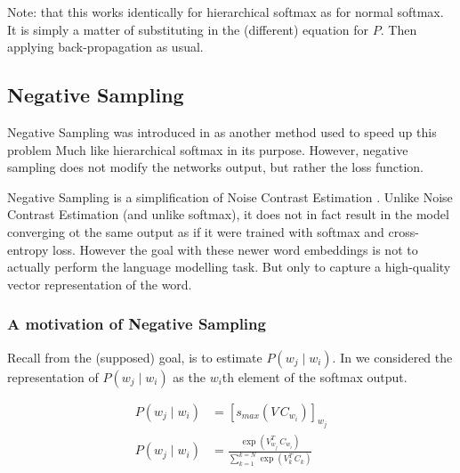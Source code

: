 \documentclass[parskip]{komatufte}
\begin{document}
Note: that this works identically for hierarchical softmax as for normal softmax.
It is simply a matter of substituting in the (different) equation for $P$.
Then applying back-propagation as usual.

\subsection{Negative Sampling}


Negative Sampling was introduced in  as another method used to speed up this problem
Much like hierarchical softmax in its purpose.
However, negative sampling does not modify the networks output,
but rather the loss function.


Negative Sampling is a simplification of Noise Contrast Estimation .
Unlike Noise Contrast Estimation (and unlike softmax), it does not in fact result in the model converging ot the same output as if it were trained with softmax and cross-entropy loss.
However the goal with these newer word embeddings is not to actually perform the language modelling task.
But only to capture a high-quality vector representation of the word.

\subsubsection{A motivation of Negative Sampling}
Recall from  the (supposed) goal, is to estimate $P(w_j\mid w_i)$.
In    we considered the representation of $P(w_j\mid w_i)$ as the $w_i$th element of the softmax output.

\begin{align}
P(w_j \mid w_{i}) & = \left[ s_{max}(V\,C_{w_{i}}) \right]_{w_j} \\
P(w_j \mid w_{i}) & = \frac{\exp(V_{w_j}^T\,C_{w_{i}})}{\sum_{k=1}^{k=N} \exp(V_k^T\,C_{k})}
\end{align}

\end{document}

